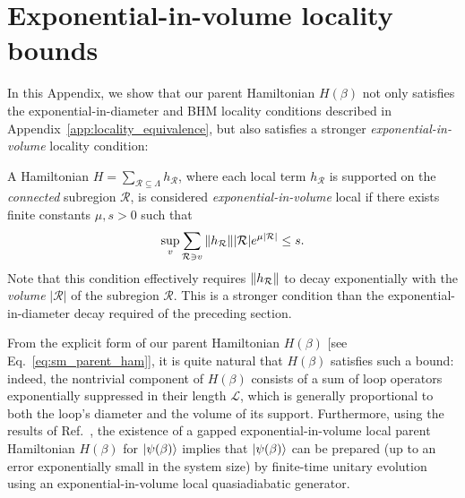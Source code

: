\section{Exponential-in-volume locality bounds}
\label{sec:exp_in_vol}
In this Appendix, we show that our parent Hamiltonian $H(\beta)$ not only satisfies the exponential-in-diameter and BHM locality conditions described in Appendix~\ref{app:locality_equivalence}, but also satisfies a stronger \emph{exponential-in-volume} locality condition:
\begin{defn}
    A Hamiltonian $H = \sum_{\mathcal{R} \subseteq \Lambda} h_{\mathcal{R}}$, where each local term $h_{\mathcal{R}}$ is supported on the \emph{connected} subregion $\mathcal{R}$, is considered \emph{exponential-in-volume} local if there exists finite constants $\mu, s > 0$ such that
    \begin{equation}
    \label{eq:expvol_locality}
        \sup_v \sum_{\mathcal{R} \ni v} \norm{h_{\mathcal{R}}} |\mathcal{R}| e^{\mu |\mathcal{R}|} \leq s .
    \end{equation}
    Note that this condition effectively requires $\norm{h_{\mathcal{R}}}$ to decay exponentially with the \emph{volume} $|\mathcal{R}|$ of the subregion $\mathcal{R}$. This is a stronger condition than the exponential-in-diameter decay required of the preceding section.
\end{defn}
From the explicit form of our parent Hamiltonian $H(\beta)$ [see Eq.~\eqref{eq:sm_parent_ham}], it is quite natural that $H(\beta)$ satisfies such a bound: indeed, the nontrivial component of $H(\beta)$ consists of a sum of loop operators exponentially suppressed in their length $\mathcal{L}$, which is generally proportional to both the loop's diameter and the volume of its support. Furthermore, using the results of Ref.~, the existence of a gapped exponential-in-volume local parent Hamiltonian $H(\beta)$ for $\ket{\psi(\beta)}$ implies that $\ket{\psi(\beta)}$ can be prepared (up to an error exponentially small in the system size) by finite-time unitary evolution using an exponential-in-volume local quasiadiabatic generator. 

